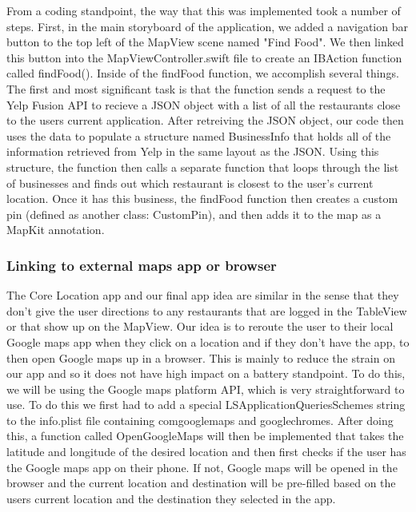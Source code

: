 \documentclass[conference]{IEEEtran}
\begin{document}
From a coding standpoint, the way that this was implemented took a number of steps.
First, in the main storyboard of the application, we added a navigation bar button
to the top left of the MapView scene named "Find Food". We then linked this button
into the MapViewController.swift file to create an IBAction function called findFood().
Inside of the findFood function, we accomplish several things. The first and 
most significant task is that the function sends a request to the Yelp Fusion API
to recieve a JSON object with a list of all the restaurants close to the users current
application. After retreiving the JSON object, our code then uses the data to populate
a structure named BusinessInfo that holds all of the information retrieved from Yelp
in the same layout as the JSON. Using this structure, the function then calls a separate
function that loops through the list of businesses and finds out which restaurant
is closest to the user's current location. Once it has this business, the findFood
function then creates a custom pin (defined as another class: CustomPin), and then
adds it to the map as a MapKit annotation.

\subsubsection{Linking to external maps app or browser}

The Core Location app and our final app idea are similar in the 
sense that they don't give the user directions to any restaurants that 
are logged in the TableView or that show up on the MapView. Our idea is to 
reroute the user to their local Google maps app when they click on a location 
and if they don't have the app, to then open Google maps up in a browser. This 
is mainly to reduce the strain on our app and so it does not have high impact 
on a battery standpoint. To do this, we will be using the Google maps platform 
API, which is very straightforward to use. To do this we first had to add a 
special LSApplicationQueriesSchemes string to the info.plist file containing 
comgooglemaps and googlechromes. After doing this, a function called OpenGoogleMaps 
will then be implemented that takes the latitude and longitude of the desired 
location and then first checks if the user has the Google maps app on their phone. 
If not, Google maps will be opened in the browser and the current location and 
destination will be pre-filled based on the users current location and the 
destination they selected in the app.
\end{document}
